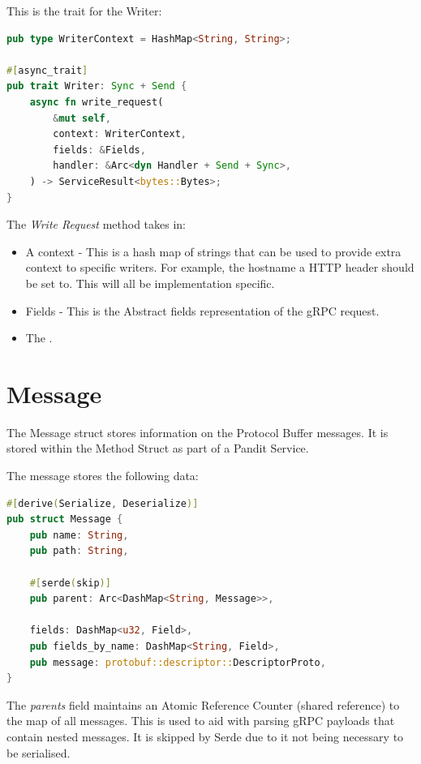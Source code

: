 \documentclass[a4paper,12pt]{report}
\begin{document}
This is the trait for the Writer:

\begin{lstlisting}[language=Rust]
pub type WriterContext = HashMap<String, String>;

#[async_trait]
pub trait Writer: Sync + Send {
    async fn write_request(
        &mut self,
        context: WriterContext,
        fields: &Fields,
        handler: &Arc<dyn Handler + Send + Sync>,
    ) -> ServiceResult<bytes::Bytes>;
}
\end{lstlisting}

The \textit{Write Request} method takes in:
\begin{itemize}
    \item A context - This is a hash map of strings that can be used to provide extra context to specific writers. 
    For example, the hostname a HTTP header should be set to. This will all be implementation specific.
    
    \item Fields - This is the Abstract fields representation of the gRPC request.
    
    \item The .
\end{itemize}

\section{Message}

The Message struct stores information on the Protocol Buffer messages.
It is stored within the Method Struct as part of a Pandit Service.

The message stores the following data:

\begin{lstlisting}[language=Rust]
#[derive(Serialize, Deserialize)]
pub struct Message {
    pub name: String,
    pub path: String,

    #[serde(skip)]
    pub parent: Arc<DashMap<String, Message>>,

    fields: DashMap<u32, Field>,
    pub fields_by_name: DashMap<String, Field>,
    pub message: protobuf::descriptor::DescriptorProto,
}
\end{lstlisting}

The \textit{parents} field maintains an Atomic Reference Counter \cite{arc} (shared reference) to the map of all messages.
This is used to aid with parsing gRPC payloads that contain nested messages. It is skipped by Serde due to it not being necessary to be serialised. 
\end{document}

